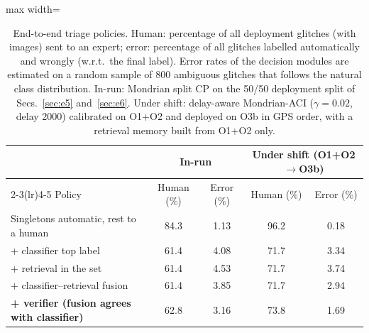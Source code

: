 \begin{table}[!htb]
\caption{End-to-end triage policies. Human: percentage of all deployment glitches (with images) sent to an expert; error:
percentage of all glitches labelled automatically and wrongly (w.r.t.\ the final label). Error rates of the decision modules are
estimated on a random sample of 800 ambiguous glitches that follows the natural class distribution. In-run: Mondrian split CP on the
50/50 deployment split of Secs.~\ref{sec:e5} and~\ref{sec:e6}. Under shift: delay-aware Mondrian-ACI ($\gamma=0.02$, delay 2000) calibrated on O1+O2 and deployed on
O3b in GPS order, with a retrieval memory built from O1+O2 only.}\label{tab:e8}
\centering\scriptsize\setlength{\tabcolsep}{4pt}
\begin{adjustbox}{max width=\columnwidth}\begin{tabular}{lcccc}\toprule
 & \multicolumn{2}{c}{In-run} & \multicolumn{2}{c}{Under shift (O1+O2$\rightarrow$O3b)}\\\cmidrule(lr){2-3}\cmidrule(lr){4-5}
Policy & Human (\%) & Error (\%) & Human (\%) & Error (\%)\\\midrule
Singletons automatic, rest to a human & 84.3 & 1.13 & 96.2 & 0.18\\
\midrule
+ classifier top label & 61.4 & 4.08 & 71.7 & 3.34\\
+ retrieval in the set & 61.4 & 4.53 & 71.7 & 3.74\\
+ classifier--retrieval fusion & 61.4 & 3.85 & 71.7 & 2.94\\
\textbf{+ verifier (fusion agrees with classifier)} & 62.8 & 3.16 & 73.8 & 1.69\\
\bottomrule
\end{tabular}\end{adjustbox}
\end{table}
